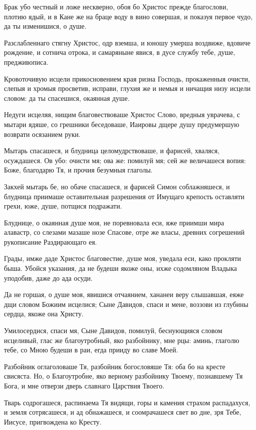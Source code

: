 Брак убо честный и ложе нескверно, обоя бо Христос прежде благослови, плотию ядый, и в Кане же на браце воду в вино совершая, и показуя первое чудо, да ты изменишися, о душе.

Разслабленнаго стягну Христос, одр вземша, и юношу умерша воздвиже, вдовиче рождение, и сотнича отрока, и самаряныне явися, в дусе службу тебе, душе, предживописа.

Кровоточивую исцели прикосновением края ризна Господь, прокаженныя очисти, слепыя и хромыя просветив, исправи, глухия же и немыя и ничащия низу исцели словом: да ты спасешися, окаянная душе.

Недуги исцеляя, нищим благовествоваше Христос Слово, вредныя уврачева, с мытари ядяше, со грешники беседоваше, Иаировы дщере душу предумершую возврати осязанием руки.

Мытарь спасашеся, и блудница целомудрствоваше, и фарисей, хваляся, осуждашеся. Ов убо: очисти мя; ова же: помилуй мя; сей же величашеся вопия: Боже, благодарю Тя, и прочия безумныя глаголы.

Закхей мытарь бе, но обаче спасашеся, и фарисей Симон соблажняшеся, и блудница приимаше оставительная разрешения от Имущаго крепость оставляти грехи, юже, душе, потщися подражати.

Блуднице, о окаянная душе моя, не поревновала еси, яже приимши мира алавастр, со слезами мазаше нозе Спасове, отре же власы, древних согрешений рукописание Раздирающаго ея.

Грады, имже даде Христос благовестие, душе моя, уведала еси, како прокляти быша. Убойся указания, да не будеши якоже оны, ихже содомляном Владыка уподобив, даже до ада осуди.

Да не горшая, о душе моя, явишися отчаянием, хананеи веру слышавшая, еяже дщи словом Божиим исцелися; Сыне Давидов, спаси и мене, воззови из глубины сердца, якоже она Христу.

Умилосердися, спаси мя, Сыне Давидов, помилуй, беснующияся словом исцеливый, глас же благоутробный, яко разбойнику, мне рцы: аминь, глаголю тебе, со Мною будеши в раи, егда прииду во славе Моей.

Разбойник оглаголоваше Тя, разбойник богословяше Тя: оба бо на кресте свисяста. Но, о Благоутробне, яко верному разбойнику Твоему, познавшему Тя Бога, и мне отверзи дверь славнаго Царствия Твоего.

Тварь содрогашеся, распинаема Тя видящи, горы и камения страхом распадахуся, и земля сотрясашеся, и ад обнажашеся, и соомрачашеся свет во дне, зря Тебе, Иисусе, пригвождена ко Кресту.

